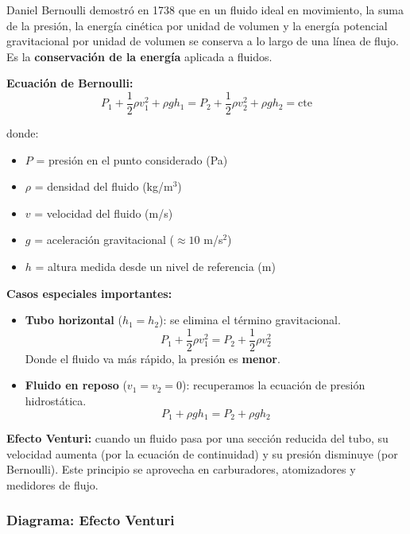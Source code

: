 \begin{seccion}
Daniel Bernoulli demostró en 1738 que en un fluido ideal en movimiento, la suma de la presión, la energía cinética por unidad de volumen y la energía potencial gravitacional por unidad de volumen se conserva a lo largo de una línea de flujo. Es la \textbf{conservación de la energía} aplicada a fluidos.

\begin{ecuacion}
\textbf{Ecuación de Bernoulli:}
$$P_1 + \frac{1}{2}\rho v_1^2 + \rho g h_1 = P_2 + \frac{1}{2}\rho v_2^2 + \rho g h_2 = \text{cte}$$

donde:
\begin{itemize}
    \item $P$ = presión en el punto considerado (Pa)
    \item $\rho$ = densidad del fluido (kg/m$^3$)
    \item $v$ = velocidad del fluido (m/s)
    \item $g$ = aceleración gravitacional ($\approx 10$ m/s$^2$)
    \item $h$ = altura medida desde un nivel de referencia (m)
\end{itemize}
\end{ecuacion}

\textbf{Casos especiales importantes:}

\begin{itemize}
    \item \textbf{Tubo horizontal} ($h_1 = h_2$): se elimina el término gravitacional.
    $$P_1 + \frac{1}{2}\rho v_1^2 = P_2 + \frac{1}{2}\rho v_2^2$$
    Donde el fluido va más rápido, la presión es \textbf{menor}.

    \item \textbf{Fluido en reposo} ($v_1 = v_2 = 0$): recuperamos la ecuación de presión hidrostática.
    $$P_1 + \rho g h_1 = P_2 + \rho g h_2$$
\end{itemize}

\textbf{Efecto Venturi:} cuando un fluido pasa por una sección reducida del tubo, su velocidad aumenta (por la ecuación de continuidad) y su presión disminuye (por Bernoulli). Este principio se aprovecha en carburadores, atomizadores y medidores de flujo.
\end{seccion}

\subsubsection{Diagrama: Efecto Venturi}

